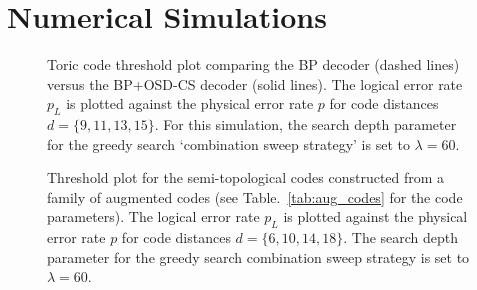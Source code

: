 \documentclass[%
 reprint,
superscriptaddress,
nofootinbib,
 amsmath,amssymb,
secnumarabic
]{revtex4-1}
\begin{document}
 
\section{Numerical Simulations}\label{sec:numerics}


\begin{figure}
	
	\caption{Toric code threshold plot comparing the BP decoder (dashed lines) versus the BP+OSD-CS decoder (solid lines). The logical error rate $p_L$ is plotted against the physical error rate $p$ for code distances $d=\{9,11,13,15\}$. For this simulation, the search depth parameter for the greedy search `combination sweep strategy' is set to $\lambda=60$.} 
	\label{plot:toric}
	
\end{figure}

\begin{figure}
	
	\caption{Threshold plot for the semi-topological codes constructed from a family of augmented codes (see Table.~\ref{tab:aug_codes} for the code parameters). The logical error rate $p_L$ is plotted against the physical error rate $p$ for code distances $d=\{6,10,14,18\}$. The search depth parameter for the greedy search combination sweep strategy is set to $\lambda=60$.} 
	\label{plot:ihgp}
	
\end{figure}
\end{document}
